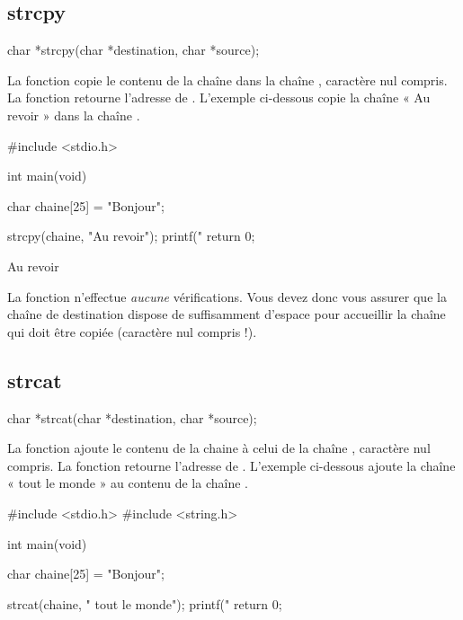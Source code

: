 \subsection{strcpy}
\label{strcpy-1}

\begin{C}
char *strcpy(char *destination, char *source);
\end{C}

La fonction  copie le contenu de la chaîne
 dans la chaîne , caractère nul
compris. La fonction retourne l'adresse de .
L'exemple ci-dessous copie la chaîne « Au revoir » dans la chaîne
.

\begin{C}
#include <stdio.h>


int main(void)
{
    char chaine[25] = "Bonjour\n";

    strcpy(chaine, "Au revoir");
    printf("%
    return 0;
}
\end{C}

\begin{C}
Au revoir
\end{C}

\begin{erreurbox}
  La fonction  n'effectue
\emph{aucune} vérifications. Vous devez donc vous assurer que la chaîne
de destination dispose de suffisamment d'espace pour accueillir la
chaîne qui doit être copiée (caractère nul compris !).
\end{erreurbox}


\subsection{strcat}
\label{strcat-1}

\begin{C}
char *strcat(char *destination, char *source);
\end{C}

La fonction  ajoute le contenu de la chaine
 à celui de la chaîne , caractère nul
compris. La fonction retourne l'adresse de .
L'exemple ci-dessous ajoute la chaîne « tout le monde » au contenu de la
chaîne .

\begin{C}
#include <stdio.h>
#include <string.h>


int main(void)
{
    char chaine[25] = "Bonjour";

    strcat(chaine, " tout le monde");
    printf("%
    return 0;
}
\end{C}

